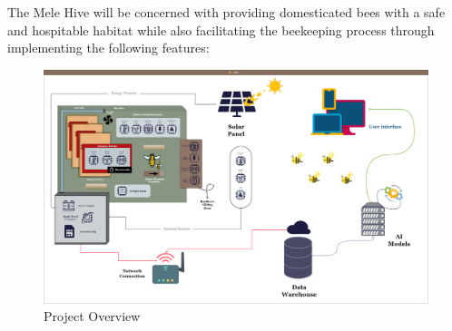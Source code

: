 \documentclass[12pt]{article}
\begin{document}
	
	The Mele Hive will be concerned with providing domesticated bees with a safe and hospitable habitat while also facilitating the beekeeping process through implementing the following features:
	
	\begin{figure}[H]
		\centering
		\includegraphics[width=\textwidth]{Images/Diagrams/System Overview.png}
		\caption{Project Overview}
		\label{fig:PROJECT_OVERVIEW}
	\end{figure}
	\vspace{1.5 cm}
\end{document}
